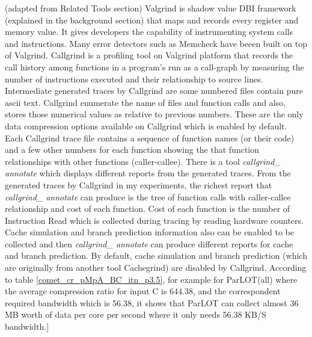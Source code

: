(adapted from Related Tools section)
Valgrind is shadow value DBI framework (explained in the background section) that maps and records every register and memory value. It gives developers the capability of instrumenting system calls and instructions. Many error detectors such as Memcheck have beeen built on top of Valgrind. Callgrind is a profiling tool  on Valgrind platform that records the call history among functions in a program's run as a call-graph by measuring the number of instructions executed and their relationship to source lines. 
Intermediate generated traces by Callgrind are some numbered files contain pure ascii text. Callgrind enumerate the name of files and function calls and also, stores those numerical values as relative to previous numbers. These are the only data compression options available on Callgrind which is enabled by default. Each Callgrind trace file contains a sequence of function names (or their code) and a few other numbers for each function showing the that function relationships with other functions (caller-callee). There is a tool \textit{callgrind\_ annotate} which displays different reports from the generated traces. From the generated traces by Callgrind in my experiments, the richest report that \textit{callgrind\_ annotate} can produce is the tree of function calls with caller-callee relationship and cost of each function. Cost of each function is the number of Instruction Read which is collected during tracing by reading hardware counters. Cache simulation and branch prediction information also can be enabled to be collected and then \textit{callgrind\_ annotate} can produce different reports for cache and branch prediction. By default, cache simulation and branch prediction (which are originally from another tool Cachegrind) are disabled by Callgrind.
According to table \ref{comet_cr_pMpA_BC_itn_p3.5}, for example for ParLOT(all) where the average compression ratio for input C is 644.38, and the correspondent required bandwidth which is 56.38, it shows that ParLOT can collect almost 36 MB worth of data per core per second where it only needs 56.38 KB/S bandwidth.] \\




